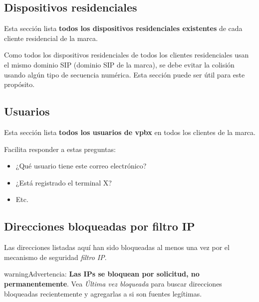 \documentclass[letterpaper,10pt,spanish]{sphinxmanual}
\begin{document}
\subsection{Dispositivos residenciales}
\label{administration_portal/brand/views/residential_devices::doc}\label{administration_portal/brand/views/residential_devices:residential-devices}
Esta sección lista \textbf{todos los dispositivos residenciales existentes} de cada cliente residencial de la marca.

Como todos los dispositivos residenciales de todos los clientes residenciales usan el mismo dominio SIP (dominio SIP de la marca), se debe evitar la colisión usando algún tipo de secuencia numérica. Esta sección puede ser útil para este propósito.


\subsection{Usuarios}
\label{administration_portal/brand/views/users::doc}\label{administration_portal/brand/views/users:users}
Esta sección lista \textbf{todos los usuarios de vpbx} en todos los clientes de la marca.

Facilita responder a estas preguntas:
\begin{itemize}
\item {} 
¿Qué usuario tiene este correo electrónico?

\item {} 
¿Está registrado el terminal X?

\item {} 
Etc.

\end{itemize}


\subsection{Direcciones bloqueadas por filtro IP}
\label{administration_portal/brand/views/ipfilter_blocked_addresses:ip-filter-blocked-addresses}\label{administration_portal/brand/views/ipfilter_blocked_addresses::doc}\label{administration_portal/brand/views/ipfilter_blocked_addresses:id1}
Las direcciones listadas aquí han sido bloqueadas al menos una vez por el mecanismo de seguridad \emph{filtro IP}.

\begin{notice}{warning}{Advertencia:}
\textbf{Las IPs se bloquean por solicitud, no permanentemente}. Vea \emph{Última vez bloqueada} para buscar direcciones bloqueadas recientemente y agregarlas a {\hyperref[security_and_maintenance/security/authorized_ip_ranges:authorized\string-ip\string-ranges]{}} si son fuentes legítimas.
\end{notice}
\end{document}
